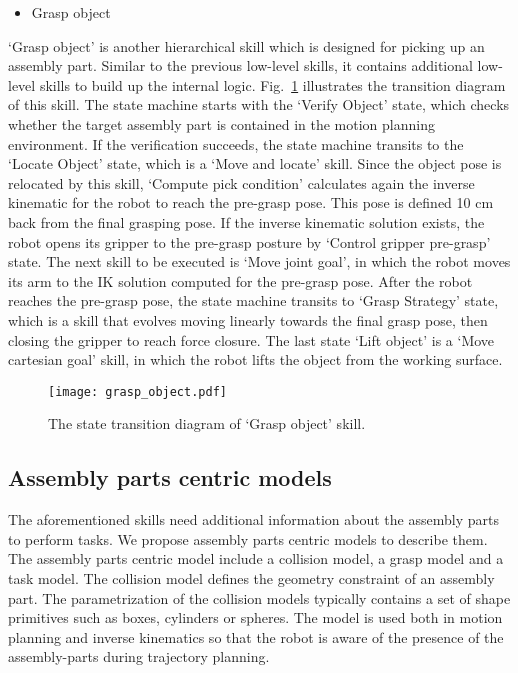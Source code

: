 \begin{itemize}
\item Grasp object
\end{itemize}
`Grasp object' is another hierarchical skill which is designed for picking up an assembly part. Similar to the previous low-level skills, it contains additional low-level skills to build up the internal logic. Fig.~\ref{fig:grasp_object} illustrates the transition diagram of this skill. The state machine starts with the `Verify Object' state, which checks whether the target assembly part is contained in the motion planning environment. If the verification succeeds, the state machine transits to the `Locate Object' state, which is a `Move and locate' skill. Since the object pose is relocated by this skill, `Compute pick condition' calculates again the inverse kinematic for the robot to reach the pre-grasp pose. This pose is defined 10 cm back from the final grasping pose. If the inverse kinematic solution exists, the robot opens its gripper to the pre-grasp posture by `Control gripper pre-grasp' state. The next skill to be executed is `Move joint goal', in which the robot moves its arm to the IK solution computed for the pre-grasp pose. After the robot reaches the pre-grasp pose, the state machine transits to `Grasp Strategy' state, which is a skill that evolves moving linearly towards the final grasp pose, then closing the gripper to reach force closure. The last state `Lift object' is a `Move cartesian goal' skill, in which the robot lifts the object from the working surface.  
\begin{figure}[!htbp]
\centering
\texttt{[image: grasp\_object.pdf]}
\captionsetup{justification=raggedright}
\caption{The state transition diagram of `Grasp object' skill.}
\label{fig:grasp_object}
\end{figure}

\subsection{Assembly parts centric models}
The aforementioned skills need additional information about the assembly parts to perform tasks. We propose assembly parts centric models to describe them. The assembly parts centric model include a collision model, a grasp model and a task model. The collision model defines the geometry constraint of an assembly part. The parametrization of the collision models typically contains a set of shape primitives such as boxes,   cylinders or spheres. The model is used both in motion planning and inverse kinematics so that the robot is aware of the presence of the assembly-parts during trajectory planning. 

